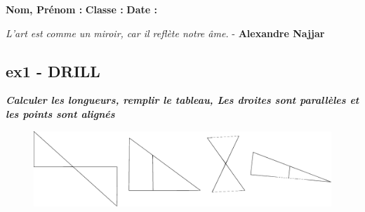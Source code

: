 \documentclass[11pt]{article}
\begin{document}

\newtheorem{Definition}{Définition}
\newtheorem{Theorem}{Théorème}
\newtheorem{Proposition}{Propriété}

\renewcommand{\labelitemi}{$\bullet$}
\renewcommand{\labelitemii}{$\circ$}
\newcommand{\Pointilles}[1][3]{%
  \multido{}{#1}{\makebox[\linewidth]{\dotfill}\\[\parskip]
}}


\setlength{\columnseprule}{1pt}

\textbf{Nom, Prénom :} \hspace{8cm} \textbf{Classe :} \hspace{3cm} \textbf{Date :}\\
\vspace{-0.2cm}
\begin{center}
  \textit{L'art est comme un miroir, car il reflète notre âme.}  - \textbf{Alexandre Najjar}
\end{center}
\vspace{-0.2cm}


\subsection*{ex1 - DRILL}
\textbf{\textit{Calculer les longueurs, remplir le tableau, Les droites sont parallèles et les points sont alignés}}


\begin{figure}[H]
  \centering
  \includegraphics[width=0.9\linewidth]{3x5-thales/thales-ie.eps}
\end{figure}
\end{document}

